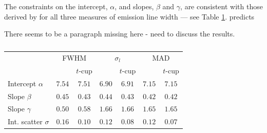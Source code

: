 \documentclass[fleqn,usenatbib]{rasti}
\begin{document}
The constraints on the intercept, $\alpha$, and slopes, $\beta$ and $\gamma$,
are consistent with those derived by \citet{Park:2017} for all three measures of
emission line width --- see Table \ref{tab:real-world.park.params}.
\citet{Park:2017} predicts

{\color{green} There seems to be a paragraph missing here - need to discuss the results.}

\begin{table}
	\centering
	\caption{}
	\label{tab:real-world.park.params}
	\begin{tabular}{lcc|cc|cc} %
                          & \multicolumn{2}{c}{FWHM} & \multicolumn{2}{c}{$\sigma_l$} & \multicolumn{2}{c}{MAD} \\
                          & \citet{Park:2017} & $t$-cup & \citet{Park:2017} & $t$-cup & \citet{Park:2017} & $t$-cup \\
    Intercept $\alpha$    & $7.54$\raisebox{0.5ex}{\tiny$^{+0.26}_{-0.27}$} & $7.51$\raisebox{0.5ex}{\tiny$^{+0.22}_{-0.22}$} & $6.90$\raisebox{0.5ex}{\tiny$^{+0.35}_{-0.34}$} & $6.91$\raisebox{0.5ex}{\tiny$^{+0.30}_{-0.31}$} & $7.15$\raisebox{0.5ex}{\tiny$^{+0.24}_{-0.25}$} & $7.15$\raisebox{0.5ex}{\tiny$^{+0.22}_{-0.22}$} \\
    Slope $\beta$         & $0.45$\raisebox{0.5ex}{\tiny$^{+0.08}_{-0.08}$} & $0.43$\raisebox{0.5ex}{\tiny$^{+0.06}_{-0.06}$} & $0.44$\raisebox{0.5ex}{\tiny$^{+0.07}_{-0.07}$} & $0.43$\raisebox{0.5ex}{\tiny$^{+0.05}_{-0.06}$} & $0.42$\raisebox{0.5ex}{\tiny$^{+0.07}_{-0.07}$} & $0.42$\raisebox{0.5ex}{\tiny$^{+0.05}_{-0.06}$} \\
    Slope $\gamma$        & $0.50$\raisebox{0.5ex}{\tiny$^{+0.55}_{-0.53}$} & $0.58$\raisebox{0.5ex}{\tiny$^{+0.44}_{-0.45}$} & $1.66$\raisebox{0.5ex}{\tiny$^{+0.65}_{-0.66}$} & $1.66$\raisebox{0.5ex}{\tiny$^{+0.57}_{-0.58}$} & $1.65$\raisebox{0.5ex}{\tiny$^{+0.61}_{-0.62}$} & $1.65$\raisebox{0.5ex}{\tiny$^{+0.55}_{-0.55}$} \\
    Int. scatter $\sigma$ & $0.16$\raisebox{0.5ex}{\tiny$^{+0.10}_{-0.08}$} & $0.10$\raisebox{0.5ex}{\tiny$^{+0.03}_{-0.10}$} & $0.12$\raisebox{0.5ex}{\tiny$^{+0.09}_{-0.06}$} & $0.08$\raisebox{0.5ex}{\tiny$^{+0.02}_{-0.08}$} & $0.12$\raisebox{0.5ex}{\tiny$^{+0.09}_{-0.06}$} & $0.07$\raisebox{0.5ex}{\tiny$^{+0.02}_{-0.07}$} \\
    \end{tabular}
\end{table}
\end{document}
